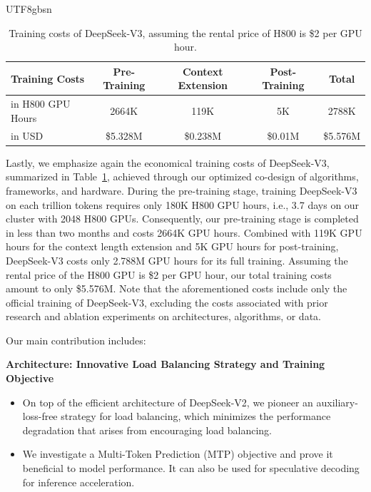 \documentclass[11pt, a4paper, logo, copyright, nonumbering]{deepseek}
\newcommand{\dsvii}{DeepSeek-V2}
\newcommand{\dsviii}{DeepSeek-V3}
\begin{document}
\begin{CJK*}{UTF8}{gbsn}
\begin{table}[t]
    \centering
    \setlength{\tabcolsep}{6pt}
    \begin{tabular}{l | c c c | c}
        \toprule
        \textbf{Training Costs} & \textbf{Pre-Training} & \textbf{Context Extension} & \textbf{Post-Training} & \textbf{Total} \\
        \midrule
        in H800 GPU Hours & 2664K & 119K & 5K & 2788K \\
        in USD & \$5.328M & \$0.238M & \$0.01M & \$5.576M \\
        \bottomrule
    \end{tabular}
    \caption{
    Training costs of \dsviii{}, assuming the rental price of H800 is \$2 per GPU hour.
    }
    \label{tab:cost}
\end{table}

Lastly, we emphasize again the economical training costs of \dsviii{}, summarized in Table~\ref{tab:cost}, achieved through our optimized co-design of algorithms, frameworks, and hardware. 
During the pre-training stage, training \dsviii{} on each trillion tokens requires only 180K H800 GPU hours, i.e., 3.7 days on our cluster with 2048 H800 GPUs. 
Consequently, our pre-training stage is completed in less than two months and costs 2664K GPU hours.
Combined with 119K GPU hours for the context length extension and 5K GPU hours for post-training, \dsviii{} costs only 2.788M GPU hours for its full training. 
Assuming the rental price of the H800 GPU is \$2 per GPU hour, our total training costs amount to only \$5.576M.
Note that the aforementioned costs include only the official training of \dsviii{}, excluding the costs associated with prior research and ablation experiments on architectures, algorithms, or data. 

Our main contribution includes:

\noindent
\textbf{Architecture: Innovative Load Balancing Strategy and Training Objective}
\begin{itemize}[topsep=0pt]
    \item 
    On top of the efficient architecture of \dsvii{}, we pioneer an auxiliary-loss-free strategy for load balancing, which minimizes the performance degradation that arises from encouraging load balancing.
    \item 
    We investigate a Multi-Token Prediction (MTP) objective and prove it beneficial to model performance. 
    It can also be used for speculative decoding for inference acceleration. 
\end{itemize}


\end{CJK*}
\end{document}
